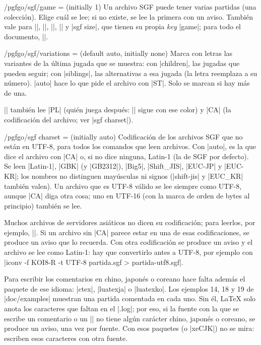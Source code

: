 \begin{key}{/pgfgo/sgf/game =  (initially 1)}
	Un archivo SGF puede tener varias partidas (una colección). Elige cuál se lee; si no existe, se lee la primera con un aviso. También vale para |\sgfanimation|, |\sgfdiagrams|, |\sgfcomment|, |\sgfinfo| y |sgf size|, que tienen su propia \emph{key} |game|; para todo el documento, ||.
\end{key}

\begin{key}{/pgfgo/sgf/variations =  (default auto, initially none)}
	Marca con letras las variantes de la última jugada que se muestra: con |children|, las jugadas que pueden seguir; con |siblings|, las alternativas a esa jugada (la letra reemplaza a su número). |auto| hace lo que pide el archivo con |ST|. Solo se marcan si hay más de una.

	\begin{codeexample}[]
		\begin{goban}[sgf size = variantes]
		\end{goban}
	\end{codeexample}
\end{key}

|\sgf| también lee |PL| (quién juega después: |\moves| sigue con ese color) y |CA| (la codificación del archivo; ver |sgf charset|).

\begin{key}{/pgfgo/sgf charset =  (initially auto)}
	Codificación de los archivos SGF que no están en UTF-8, para todos los comandos que leen archivos. Con |auto|, es la que dice el archivo con |CA| o, si no dice ninguna, Latin-1 (la de SGF por defecto). Se leen |Latin-1|, |GBK| (y |GB2312|), |Big5|, |Shift_JIS|, |EUC-JP| y |EUC-KR|; los nombres no distinguen mayúsculas ni signos (|shift-jis| y |EUC_KR| también valen). Un archivo que es UTF-8 válido se lee siempre como UTF-8, aunque |CA| diga otra cosa; uno en UTF-16 (con la marca de orden de bytes al principio) también se lee.

	Muchos archivos de servidores asiáticos no dicen su codificación; para leerlos, por ejemplo, ||. Si un archivo sin |CA| parece estar en una de esas codificaciones, se produce un aviso que lo recuerda. Con otra codificación se produce un aviso y el archivo se lee como Latin-1: hay que convertirlo antes a UTF-8, por ejemplo con |iconv -f KOI8-R -t UTF-8 partida.sgf > partida-utf8.sgf|.

	Para escribir los comentarios en chino, japonés o coreano hace falta además el paquete de ese idioma: |ctex|, |luatexja| o |luatexko|. Los ejemplos 14, 18 y 19 de |doc/examples| muestran una partida comentada en cada uno. Sin él, LaTeX solo anota los caracteres que faltan en el |.log|; por eso, si la fuente con la que se escribe un comentario o un |\sgfinfo| no tiene algún carácter chino, japonés o coreano, se produce un aviso, una vez por fuente. Con esos paquetes (o |xeCJK|) no se mira: escriben esos caracteres con otra fuente.
\end{key}

